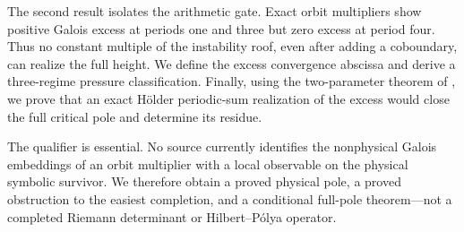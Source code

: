 The second result isolates the arithmetic gate.  Exact orbit multipliers show
positive Galois excess at periods one and three but zero excess at period four.
Thus no constant multiple of the instability roof, even after adding a
coboundary, can realize the full height.  We define the excess convergence
abscissa and derive a three-regime pressure classification.  Finally, using
the two-parameter theorem of \citet[Theorem~6.4 and
Corollary~6.4.1]{ParryPollicott1990}, we prove that an exact H\"older
periodic-sum realization of the excess would close the full critical pole and
determine its residue.

The qualifier is essential.  No source currently identifies the nonphysical
Galois embeddings of an orbit multiplier with a local observable on the
physical symbolic survivor.  We therefore obtain a proved physical pole, a
proved obstruction to the easiest completion, and a conditional full-pole
theorem---not a completed Riemann determinant or Hilbert--P\'olya operator.
